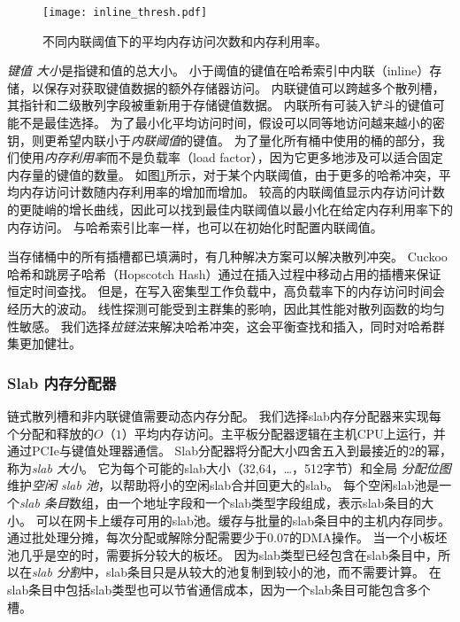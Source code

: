 \begin{figure}[t]
\centering
\texttt{[image: inline\_thresh.pdf]}
\caption{不同内联阈值下的平均内存访问次数和内存利用率。}
\label{kvdirect:fig:inline-offline}

\end{figure}

\textit {键值 大小}是指键和值的总大小。
小于阈值的键值在哈希索引中内联（inline）存储，以保存对获取键值数据的额外存储器访问。
内联键值可以跨越多个散列槽，其指针和二级散列字段被重新用于存储键值数据。
内联所有可装入铲斗的键值可能不是最佳选择。
为了最小化平均访问时间，假设可以同等地访问越来越小的密钥，则更希望内联小于\textit {内联阈值}的键值。
为了量化所有桶中使用的桶的部分，我们使用\textit {内存利用率}而不是负载率（load factor），因为它更多地涉及可以适合固定内存量的键值的数量。
如图\ref {kvdirect:fig:inline-offline}所示，对于某个内联阈值，由于更多的哈希冲突，平均内存访问计数随内存利用率的增加而增加。
较高的内联阈值显示内存访问计数的更陡峭的增长曲线，因此可以找到最佳内联阈值以最小化在给定内存利用率下的内存访问。
与哈希索引比率一样，也可以在初始化时配置内联阈值。

当存储桶中的所有插槽都已填满时，有几种解决方案可以解决散列冲突。
Cuckoo哈希\cite {pagh2004cuckoo}和跳房子哈希（Hopscotch Hash）\cite {herlihy2008hopscotch}通过在插入过程中移动占用的插槽来保证恒定时间查找。
但是，在写入密集型工作负载中，高负载率下的内存访问时间会经历大的波动。
线性探测可能受到主群集的影响，因此其性能对散列函数的均匀性敏感。
我们选择\textit {拉链法}来解决哈希冲突，这会平衡查找和插入，同时对哈希群集更加健壮。


\subsubsection{Slab 内存分配器}
\label{kvdirect:sec:slab}

链式散列槽和非内联键值需要动态内存分配。
我们选择slab内存分配器\cite {bonwick1994slab}来实现每个分配和释放的$O（1）$平均内存访问。主平板分配器逻辑在主机CPU上运行，并通过PCIe与键值处理器通信。
Slab分配器将分配大小四舍五入到最接近的2的幂，称为\textit {slab 大小}。
它为每个可能的slab大小（32,64，\ldots，512字节）和全局 \textit {分配位图}维护\textit {空闲 slab 池}，以帮助将小的空闲slab合并回更大的slab。
每个空闲slab池是一个\textit {slab 条目}数组，由一个地址字段和一个slab类型字段组成，表示slab条目的大小。
可以在网卡上缓存可用的slab池。缓存与批量的slab条目中的主机内存同步。通过批处理分摊，每次分配或解除分配需要少于0.07的DMA操作。
当一个小板坯池几乎是空的时，需要拆分较大的板坯。
因为slab类型已经包含在slab条目中，所以在\textit {slab 分割}中，slab条目只是从较大的池复制到较小的池，而不需要计算。
在slab条目中包括slab类型也可以节省通信成本，因为一个slab条目可能包含多个槽。

